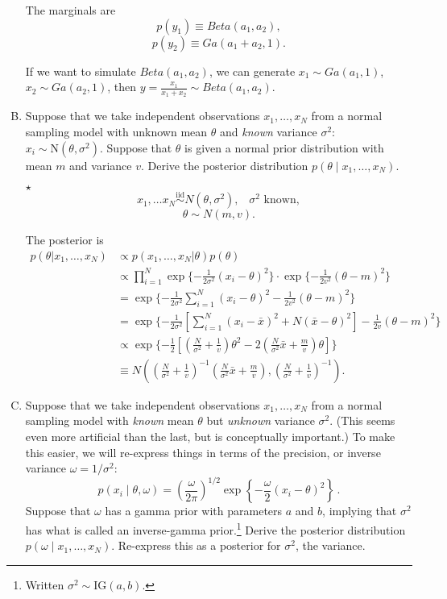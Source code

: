 \documentclass[11pt]{article}
\newcommand{\jie}{$\star$ }
\newcommand{\iid}{\overset{\text{iid}}{\sim}}
\begin{document}
\begin{enumerate}[(A)]
The marginals are
$$p(y_1) \equiv Beta(a_1,a_2),$$
$$p(y_2) \equiv Ga(a_1+a_2,1).$$

If we want to simulate $Beta(a_1,a_2)$, we can generate $x_1 \sim Ga(a_1,1)$, $x_2 \sim Ga(a_2,1)$, then $y = \frac{x_1}{x_1+x_2} \sim Beta(a_1,a_2)$.

\bigskip

\item Suppose that we take independent observations $x_1, \ldots, x_N$ from a normal sampling model with unknown mean $\theta$ and \textit{known} variance $\sigma^2$: $x_i \sim \mbox{N}(\theta, \sigma^2)$.  Suppose that $\theta$ is given a normal prior distribution with mean $m$ and variance $v$.  Derive the posterior distribution $p(\theta \mid x_1, \ldots, x_N)$.

\bigskip

\jie 
$$x_1, \dots x_N \iid N(\theta,\sigma^2), \;\;\; \sigma^2 \text{ known},$$
$$\theta \sim N(m,v).$$

The posterior is
\begin{align*}
    p(\theta|x_1,\dots,x_N) &\propto p(x_1,\dots,x_N |\theta) p(\theta) \\
    &\propto \prod_{i=1}^N \exp \{-\frac{1}{2\sigma^2} (x_i-\theta)^2\} \cdot \exp \{-\frac{1}{2v^2} (\theta-m)^2\} \\
    &= \exp \{-\frac{1}{2\sigma^2} \sum_{i=1}^N (x_i-\theta)^2 - \frac{1}{2v^2}(\theta-m)^2 \} \\
    &= \exp \{-\frac{1}{2\sigma^2} [\sum_{i=1}^N (x_i-\bar{x})^2 + N(\bar{x}-\theta)^2] - \frac{1}{2v}(\theta-m)^2 \} \\
    &\propto \exp \{ -\frac{1}{2} [(\frac{N}{\sigma^2}+\frac{1}{v}) \theta^2 - 2(\frac{N}{\sigma^2} \bar{x} + \frac{m}{v}) \theta] \} \\
    &\equiv N( (\frac{N}{\sigma^2}+\frac{1}{v})^{-1}(\frac{N}{\sigma^2} \bar{x} + \frac{m}{v}), (\frac{N}{\sigma^2}+\frac{1}{v})^{-1} ).
\end{align*}

\bigskip

\item Suppose that we take independent observations $x_1, \ldots, x_N$ from a normal sampling model with \textit{known} mean $\theta$ but \textit{unknown} variance $\sigma^2$.  (This seems even more artificial than the last, but is conceptually important.)  To make this easier, we will re-express things in terms of the precision, or inverse variance $\omega = 1/\sigma^2$:
$$
p(x_i \mid \theta, \omega) = \left( \frac{\omega}{2 \pi} \right)^{1/2} \exp \left\{ -\frac{\omega}{2} (x_i - \theta)^2 \right\} \, .
$$
Suppose that $\omega$ has a gamma prior with parameters $a$ and $b$, implying that $\sigma^2$ has what is called an inverse-gamma prior.\footnote{Written $\sigma^2 \sim \mbox{IG}(a,b)$.}  Derive the posterior distribution $p(\omega \mid x_1, \ldots, x_N)$.  Re-express this as a posterior for $\sigma^2$, the variance.


\end{enumerate}
\end{document}
